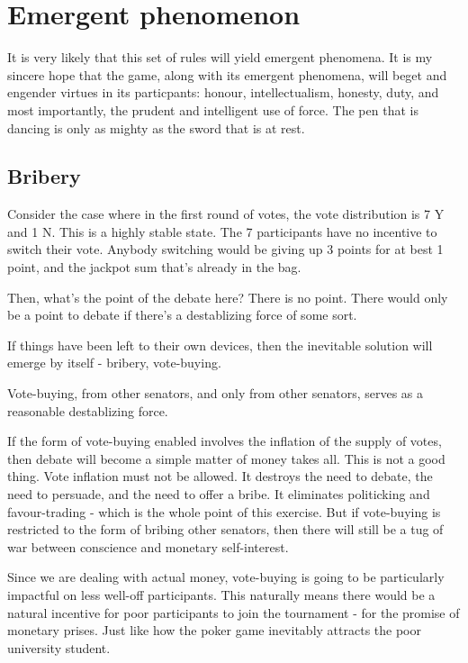 


\section{Emergent phenomenon}

It is very likely that this set of rules will yield emergent phenomena. It is my sincere hope that the game, along with its emergent phenomena, will beget and engender virtues in its particpants: honour, intellectualism, honesty, duty, and most importantly, the prudent and intelligent use of force. The pen that is dancing is only as mighty as the sword that is at rest.


\subsection{Bribery}

Consider the case where in the first round of votes, the vote distribution is 7 Y and 1 N. This is a highly stable state. The 7 participants have no incentive to switch their vote. Anybody switching would be giving up 3 points for at best 1 point, and the jackpot sum that's already in the bag. 

Then, what's the point of the debate here? There is no point. There would only be a point to debate if there's a destablizing force of some sort. 

If things have been left to their own devices, then the inevitable solution will emerge by itself - bribery, vote-buying.  

Vote-buying, from other senators, and only from other senators, serves as a reasonable destablizing force. 

If the form of vote-buying enabled involves the inflation of the supply of votes, then debate will become a simple matter of money takes all. This is not a good thing. Vote inflation must not be allowed. It destroys the need to debate, the need to persuade, and the need to offer a bribe. It eliminates politicking and favour-trading - which is the whole point of this exercise. But if vote-buying is restricted to the form of bribing other senators, then there will still be a tug of war between conscience and monetary self-interest. 


Since we are dealing with actual money, vote-buying is going to be particularly impactful on less well-off participants. This naturally means there would be a natural incentive for poor participants to join the tournament - for the promise of monetary prises. Just like how the poker game inevitably attracts the poor university student.


